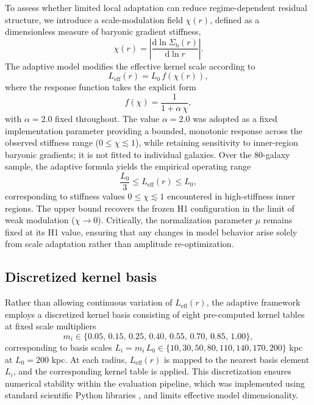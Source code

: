 \documentclass[twocolumn,linenumbers]{aastex701}
\begin{document}
To assess whether limited local adaptation can reduce regime-dependent
residual structure, we introduce a scale-modulation field $\chi(r)$,
defined as a dimensionless measure of baryonic gradient stiffness,
\begin{equation}
	\chi(r) = \left| \frac{\mathrm{d} \ln \Sigma_{\mathrm{b}}(r)}
	{\mathrm{d} \ln r} \right|.
	\label{eq:chi}
\end{equation}
The adaptive model modifies the effective kernel scale according to
\begin{equation}
	L_{\mathrm{eff}}(r) = L_0 \, f(\chi(r)),
	\label{eq:leff}
\end{equation}
where the response function takes the explicit form
\begin{equation}
	f(\chi) = \frac{1}{1 + \alpha\,\chi},
	\label{eq:fchi}
\end{equation}
with $\alpha = 2.0$ fixed throughout. The value $\alpha = 2.0$ was
adopted as a fixed implementation parameter providing a bounded, monotonic
response across the observed stiffness range ($0 \leq \chi \lesssim 1$),
while retaining sensitivity to inner-region baryonic gradients; it is not
fitted to individual galaxies. Over the 80-galaxy sample, the
adaptive formula yields the empirical operating range
\begin{equation}
	\frac{L_0}{3} \leq L_{\mathrm{eff}}(r) \leq L_0,
	\label{eq:bound}
\end{equation}
corresponding to stiffness values $0 \leq \chi \lesssim 1$ encountered
in high-stiffness inner regions. The upper bound recovers the frozen H1
configuration in the limit of weak modulation ($\chi \to 0$).
Critically, the normalization parameter $\mu$ remains fixed at its H1 value,
ensuring that any changes in model behavior arise solely from scale
adaptation rather than amplitude re-optimization.

\subsection{Discretized kernel basis}

Rather than allowing continuous variation of $L_{\mathrm{eff}}(r)$, the
adaptive framework employs a discretized kernel basis consisting of eight
pre-computed kernel tables at fixed scale multipliers
\begin{equation}
	m_i \in \{0.05,\,0.15,\,0.25,\,0.40,\,0.55,\,0.70,\,0.85,\,1.00\},
	\label{eq:basis}
\end{equation}
corresponding to basis scales $L_i = m_i \, L_0 \in \{10, 30, 50, 80, 110, 140, 170, 200\}$ kpc
at $L_0 = 200$ kpc. At each radius, $L_{\mathrm{eff}}(r)$ is mapped to the
nearest basis element $L_i$, and the corresponding kernel table is applied.
This discretization ensures numerical stability within the evaluation pipeline,
which was implemented using standard scientific Python libraries
\citep{numpy2020, scipy2020}, and limits effective model dimensionality.
\end{document}
